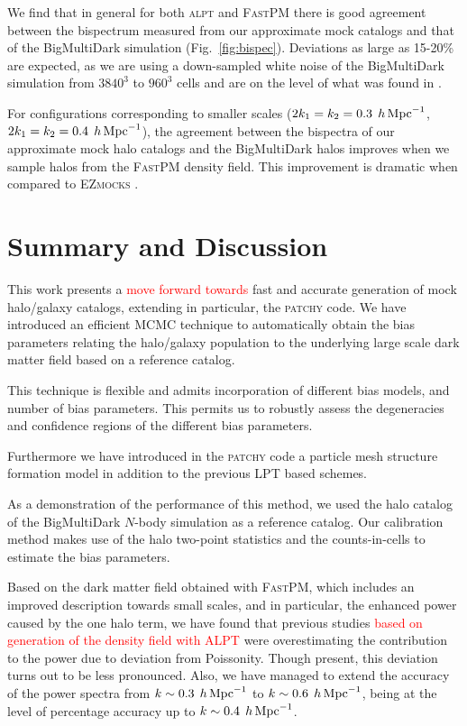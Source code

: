 \documentclass[english,usenatbib]{mn2e}
\newcommand{\tod}[1]{{\textcolor{red}{ #1}}}
\newcommand{\hperm}{\,h\,{\rm Mpc}^{-1}}
\begin{document}
We find that in general for both \textsc{alpt} and \textsc{FastPM} there is good agreement between the bispectrum measured from our approximate mock catalogs and that of the BigMultiDark simulation (Fig.~\ref{fig:bispec}). 
Deviations as large as 15-20\% are expected, as we are using a down-sampled  white noise of the BigMultiDark simulation from $3840^3$ to $960^3$ cells and are on the level of what was found in \citet[][]{kitaura2015}. 

For configurations corresponding to smaller scales ($2k_1=k_2=0.3\;\hperm$, $2k_1=k_2=0.4\;\hperm$), the agreement between the bispectra of our approximate mock halo catalogs and the BigMultiDark halos improves when we sample halos from the \textsc{FastPM} density field. This improvement is dramatic when compared to \textsc{EZmocks} \citep[see real-space lines in the lower panels in Fig.~5 of][]{eazymock}.


\section{Summary and Discussion}
\label{sec:discussion}


This work presents a \tod{move forward towards} fast and accurate generation of mock halo/galaxy catalogs, extending in particular, the \textsc{patchy} code. We have introduced an efficient MCMC technique to automatically obtain the bias parameters relating the halo/galaxy population to the underlying large scale dark matter field based on a reference catalog. 

This technique is flexible and admits incorporation of different bias models, and number of bias parameters. This permits us to robustly assess the degeneracies and confidence regions of the different bias parameters.

Furthermore we have introduced in the \textsc{patchy} code a particle mesh structure formation model \citep[the \textsc{FastPM} code, see][]{fastpm} in addition to the previous LPT based schemes.


As a demonstration of the performance of this method, we used the halo catalog of the BigMultiDark $N$-body simulation as a reference catalog. Our calibration method makes use of the halo two-point statistics and the counts-in-cells to estimate the bias parameters. 

Based on the dark matter field obtained with \textsc{FastPM}, which includes an improved description towards small scales, and in particular, the enhanced power caused by the one halo term, we have found that previous studies \tod{based on generation of the density field with \textsc{ALPT}} were overestimating the contribution to the power due to deviation from Poissonity. Though present, this deviation turns out to be less pronounced. Also, we have managed to extend the accuracy of the power spectra from $k\sim 0.3\; \hperm$ to $k\sim 0.6 \;\hperm$, being at the level of percentage accuracy up to $k\sim 0.4\; \hperm$.
\end{document}
